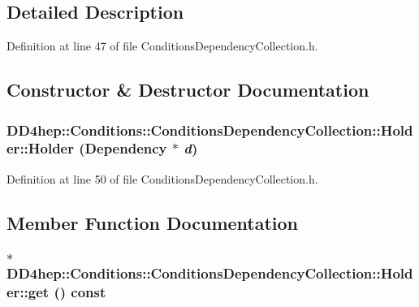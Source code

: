 \subsection{Detailed Description}


Definition at line 47 of file ConditionsDependencyCollection.h.

\subsection{Constructor \& Destructor Documentation}
\hypertarget{struct_d_d4hep_1_1_conditions_1_1_conditions_dependency_collection_1_1_holder_a2eb63a4f316a695d951a31ef4d230fee}{
\subsubsection[{Holder}]{\setlength{\rightskip}{0pt plus 5cm}DD4hep::Conditions::ConditionsDependencyCollection::Holder::Holder ({\bf Dependency} $\ast$ {\em d})}}
\label{struct_d_d4hep_1_1_conditions_1_1_conditions_dependency_collection_1_1_holder_a2eb63a4f316a695d951a31ef4d230fee}


Definition at line 50 of file ConditionsDependencyCollection.h.

\subsection{Member Function Documentation}
\hypertarget{struct_d_d4hep_1_1_conditions_1_1_conditions_dependency_collection_1_1_holder_a63b5df08ae719a69f2d76129f8a207ad}{
\subsubsection[{get}]{$\ast$ DD4hep::Conditions::ConditionsDependencyCollection::Holder::get () const}}
\label{struct_d_d4hep_1_1_conditions_1_1_conditions_dependency_collection_1_1_holder_a63b5df08ae719a69f2d76129f8a207ad}


